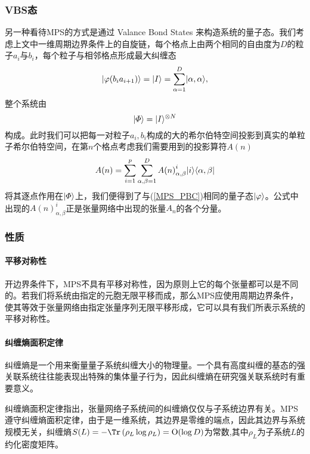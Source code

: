 \subsubsection{VBS态}
另一种看待MPS的方式是通过 Valance Bond States \cite[8]{dongZhangLiangWangLuoSuanFaCongBoSeZiXiTongDaoFeiMiZiXiTong2017}来构造系统的量子态。我们考虑上文中一维周期边界条件上的自旋链，每个格点上由两个相同的自由度为$D$的粒子$a_i$与$b_i$，每个粒子与相邻格点形成最大纠缠态
\begin{equation}
\lvert\varphi(b_i a_{i+1})\rangle = \lvert I\rangle = \sum_{\alpha=1}^D \lvert\alpha,\alpha\rangle,
\end{equation}
整个系统由
\begin{equation}
\lvert\varPhi\rangle = \lvert I\rangle^{\otimes N}
\end{equation}
构成。此时我们可以把每一对粒子$a_i,b_i$构成的大的希尔伯特空间投影到真实的单粒子希尔伯特空间，在第$n$个格点考虑我们需要用到的投影算符$A(n)$
\begin{equation}
A(n) = \sum_{i=1}^p\sum_{\alpha,\beta=1}^D {A(n)}^i_{\alpha,\beta}\lvert i\rangle\langle\alpha,\beta\rvert
\end{equation}
将其逐点作用在$\lvert\varPhi\rangle$上，我们便得到了与(\ref{MPS_PBC})相同的量子态$\lvert\varphi\rangle$。公式中出现的$A(n)^i_{\alpha,\beta}$正是张量网络中出现的张量$A_n$的各个分量。
\subsubsection{性质}

\paragraph{平移对称性}

开边界条件下，MPS不具有平移对称性，因为原则上它的每个张量都可以是不同的。若我们将系统由指定的元胞无限平移而成，那么MPS应使用周期边界条件，使其等效于张量网络由指定张量序列无限平移形成，它可以具有我们所表示系统的平移对称性。

\paragraph{纠缠熵面积定律}

纠缠熵是一个用来衡量量子系统纠缠大小的物理量。一个具有高度纠缠的基态的强关联系统往往能表现出特殊的集体量子行为\cite{vidalEntanglementQuantumCritical2003}，因此纠缠熵在研究强关联系统时有重要意义。

纠缠熵面积定律指出，张量网络子系统间的纠缠熵仅仅与子系统边界有关。MPS遵守纠缠熵面积定律，由于是一维系统，其边界是零维的端点，因此其边界与系统规模无关，纠缠熵$S(L)=-\Tr\left(\rho_L\log\rho_L\right)=\mathrm{O}(\log D)$为常数\cite{PracticalIntroductionTensor2014},其中$\rho_L$为子系统$L$的约化密度矩阵。


